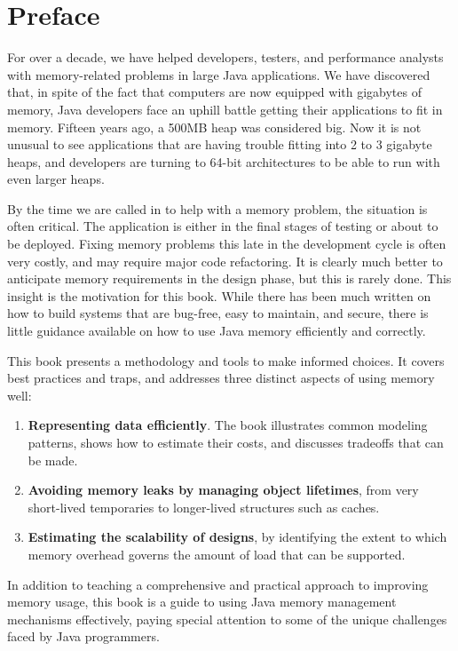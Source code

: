 \chapter*{Preface}
\label{chapter:preface}

For over a decade, we have helped developers, testers, and performance
analysts with memory-related problems in large Java applications.  
We have discovered that, in spite of the fact that computers are now equipped
with gigabytes of memory, Java developers face an uphill battle getting their applications to fit
in memory. Fifteen years ago, a 500MB heap was considered big.  Now it is not
unusual to see applications that are having trouble fitting into 2 to 3
gigabyte heaps, and developers are turning to 64-bit architectures to be able to
run with even larger heaps.

By the time we are called in to help with a memory problem, the situation
is often critical. The application is either in the final stages of testing or
about to be deployed. Fixing memory problems this late in the development cycle
is often very costly, and may require major code refactoring. It is clearly much
better to anticipate memory requirements in the design phase, but this is rarely
done. This insight is the motivation for this book. While there has been much written on
how to build systems that are bug-free, easy to maintain, and secure, there is
little guidance available on how to use Java memory efficiently and correctly.

This book presents a methodology and tools to make informed choices. It covers
best practices and traps, and addresses three distinct aspects of using memory
well:
\begin{enumerate}
	\item \textbf{Representing data efficiently}. The book illustrates
	common modeling patterns, shows how to estimate their costs, and
	discusses tradeoffs that can be made.
	\item \textbf{Avoiding memory leaks by managing object lifetimes}, from very
	short-lived temporaries to longer-lived structures such as caches.
	\item \textbf{Estimating the scalability of designs}, by identifying the
	extent to which memory overhead governs the amount of load that can be
	supported.
\end{enumerate}

In addition to teaching a comprehensive and practical approach to improving
memory usage, this book is a guide to using Java memory management 
mechanisms effectively, paying special attention to some of the unique
challenges faced by Java programmers.


